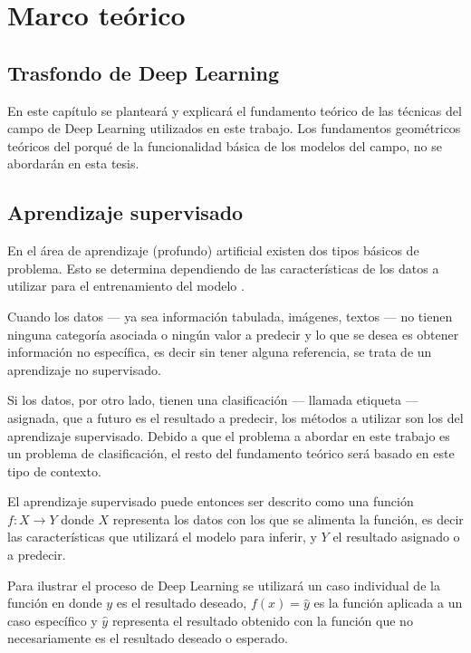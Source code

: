 \chapter{Marco teórico} %

\label{Chapter2} %

\section{Trasfondo de Deep Learning} %

En este capítulo se planteará y explicará el fundamento teórico de las técnicas del campo de Deep Learning utilizados en este trabajo. Los fundamentos geométricos teóricos \parencite{2018leigeometric} del porqué de la funcionalidad básica de los modelos del campo, no se abordarán en esta tesis.

\section{Aprendizaje supervisado}

En el área de aprendizaje (profundo) artificial existen dos tipos básicos de problema. Esto se determina dependiendo de las características de los datos a utilizar para el entrenamiento del modelo \parencite{schmidhuber2015deep}.

Cuando los datos --- ya sea información tabulada, imágenes, textos --- no tienen ninguna categoría asociada o ningún valor a predecir y lo que se desea es obtener información no específica, es decir sin tener alguna referencia, se trata de un aprendizaje no supervisado.

Si los datos, por otro lado, tienen una clasificación  --- llamada etiqueta --- asignada, que a futuro es el resultado a predecir, los métodos a utilizar son los del \gls{aprendizaje supervisado}. Debido a que el problema a abordar en este trabajo es un problema de clasificación, el resto del fundamento teórico será basado en este tipo de contexto.

El aprendizaje supervisado puede entonces ser descrito como una función $f : X \to Y$ donde $X$ representa los datos con los que se alimenta la función, es decir las características que utilizará el modelo para inferir, y $Y$ el resultado asignado o a predecir.

Para ilustrar el proceso de Deep Learning se utilizará un caso individual de la función en donde $y$ es el resultado deseado, $f(x) = \hat{y}$ es la función aplicada a un caso específico y $\hat{y}$ representa el resultado obtenido con la función que no necesariamente es el resultado deseado o esperado.

